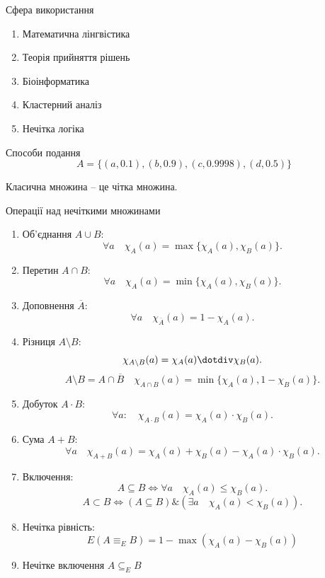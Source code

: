 Сфера використання
\begin{enumerate}
    \item Математична лінгвістика
    \item Теорія прийняття рішень
    \item Біоінформатика
    \item Кластерний аналіз
    \item Нечітка логіка
\end{enumerate}

Способи подання
$$A = \{ (a, 0.1), (b, 0.9), (c, 0.9998), (d, 0.5) \}$$

Класична множина -- це чітка множина.

Операції над нечіткими множинами
\begin{enumerate}
    \item Об'єднання $A \cup B$:
        $$\forall a \quad \chi_A(a) = \max \{ \chi_A(a), \chi_B(a) \}.$$
    \item Перетин $A \cap B$:
        $$\forall a \quad \chi_A(a) = \min \{ \chi_A(a), \chi_B(a) \}.$$
    \item Доповнення $\overline{A}$:
        $$\forall a \quad \chi_{\overline{A}}(a) = 1 - \chi_A(a).$$
    \item Різниця $A \setminus B$:
        $$\chi_{A \setminus B}(a) = \chi_A(a) \dotdiv \chi_B(a).$$
        $$A \setminus B = A \cap \overline{B} \quad \chi_{A \cap B}(a) = \min \{ \chi_A(a), 1 - \chi_B(a) \}.$$
    \item Добуток $A \cdot B$:
        $$\forall a: \quad \chi_{A \cdot B}(a) = \chi_A(a) \cdot \chi_B(a).$$
    \item Сума $A + B$:
        $$\forall a \quad \chi_{A + B}(a) = \chi_A(a) + \chi_B(a) - \chi_A(a) \cdot \chi_B(a).$$
    \item Включення:
        $$A \subseteq B \Leftrightarrow \forall a \quad \chi_A(a) \leqslant \chi_B(a).$$
        $$A \subset B \Leftrightarrow  (A \subseteq B) \& (\exists a \quad \chi_A(a) < \chi_B(a)).$$
    \item Нечітка рівність:
        $$E (A \equiv_E B) = 1 - \max (\chi_A(a) - \chi_B(a))$$
    \item Нечітке включення $A \subseteq_E B$
\end{enumerate}

